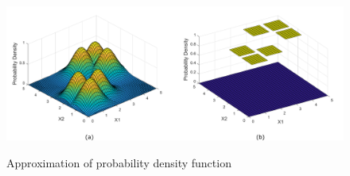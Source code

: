 \begin{enumerate}
\begin{figure}[t]
\centering
   \includegraphics[height=0.4\columnwidth]{Figures/pdf.pdf}
   \label{fig:pnn}
   \caption{Approximation of probability density function}
\end{figure}


\end{enumerate}